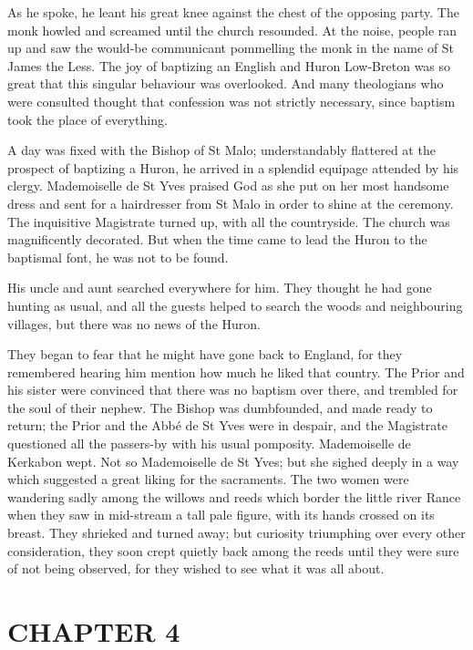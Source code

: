 \documentclass{article}
\begin{document}
\begin{center}
As he spoke, he leant his great knee against the chest of the opposing party. The 
monk howled and screamed until the church resounded. At the noise, people ran up 
and saw the would-be communicant pommelling the monk in the name of St James the 
Less. The joy of baptizing an English and Huron Low-Breton was so great that this 
singular behaviour was overlooked. And many theologians who were consulted thought 
that confession was not strictly necessary, since baptism took the place of everything. 

A day was fixed with the Bishop of St Malo; understandably flattered at the prospect 
of baptizing a Huron, he arrived in a splendid equipage attended by his clergy. 
Mademoiselle de St Yves praised God as she put on her most handsome dress and sent 
for a hairdresser from St Malo in order to shine at the ceremony. The inquisitive 
Magistrate turned up, with all the countryside. The church was magnificently decorated. 
But when the time came to lead the Huron to the baptismal font, he was not to be 
found. 

His uncle and aunt searched everywhere for him. They thought he had gone hunting 
as usual, and all the guests helped to search the woods and neighbouring villages, 
but there was no news of the Huron. 

They began to fear that he might have gone back to England, for they remembered 
hearing him mention how much he liked that country. The Prior and his sister were 
convinced that there was no baptism over there, and trembled for the soul of their 
nephew. The Bishop was dumbfounded, and made ready to return; the Prior and the 
Abbé de St Yves were in despair, and the Magistrate questioned all the passers-by 
with his usual pomposity. Mademoiselle de Kerkabon wept. Not so Mademoiselle de 
St Yves; but she sighed deeply in a way which suggested a great liking for the 
sacraments. The two women were wandering sadly among the willows and reeds which 
border the little river Rance when they saw in mid-stream a tall pale figure, with 
its hands crossed on its breast. They shrieked and turned away; but curiosity triumphing 
over every other consideration, they soon crept quietly back among the reeds until 
they were sure of not being observed, for they wished to see what it was all about.\pagebreak{} 

\section*{\textbf{CHAPTER 4  }}


\end{center}
\end{document}
